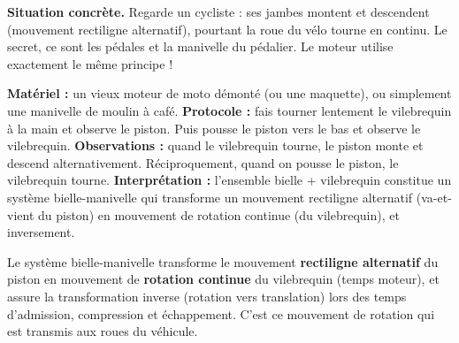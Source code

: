 \documentclass[11pt]{article}
\newcommand{\cle}[1]{{\popxbold\color{popdark}#1}}
\begin{document}
\textbf{Situation concrète.} Regarde un cycliste : ses jambes montent et descendent (mouvement rectiligne alternatif), pourtant la roue du vélo tourne en continu. Le secret, ce sont les pédales et la manivelle du pédalier. Le moteur utilise exactement le même principe !

\begin{experience}
\textbf{Matériel :} un vieux moteur de moto démonté (ou une maquette), ou simplement une manivelle de moulin à café.
\textbf{Protocole :} fais tourner lentement le vilebrequin à la main et observe le piston. Puis pousse le piston vers le bas et observe le vilebrequin.
\textbf{Observations :} quand le vilebrequin tourne, le piston monte et descend alternativement. Réciproquement, quand on pousse le piston, le vilebrequin tourne.
\textbf{Interprétation :} l'ensemble bielle + vilebrequin constitue un système \cle{bielle-manivelle} qui transforme un mouvement rectiligne alternatif (va-et-vient du piston) en mouvement de rotation continue (du vilebrequin), et inversement.
\end{experience}

\begin{propriete}
Le système bielle-manivelle transforme le mouvement \textbf{rectiligne alternatif} du piston en mouvement de \textbf{rotation continue} du vilebrequin (temps moteur), et assure la transformation inverse (rotation vers translation) lors des temps d'admission, compression et échappement. C'est ce mouvement de rotation qui est transmis aux roues du véhicule.
\end{propriete}
\end{document}
